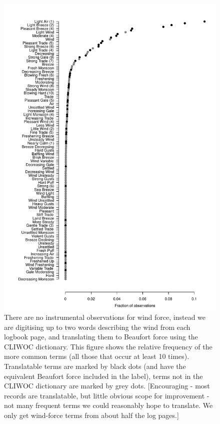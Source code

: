 \documentclass[a4paper,11pt]{article}
\begin{document}
\clearpage

\begin{figure}
\begin{center}
\includegraphics[angle=0, width=1.0\textwidth]{../winds/term_frequencies}
\caption{There are no instrumental observations for wind force, instead we are digitising up to two words describing the wind from each logbook page, and translating them to Beaufort force using the CLIWOC dictionary. This figure shows the relative frequency of the more common terms (all those that occur at least 10 times). Translatable terms are marked by black dots (and have the equivalent Beaufort force included in the label), terms not in the CLIWOC dictionary are marked by grey dots. [Encouraging - most records are translatable, but little obvious scope for improvement - not many frequent terms we could reasonably hope to translate. We only get wind-force terms from about half the log pages.]}
\label{wind terms}
\end{center}
\end{figure}
\end{document}
